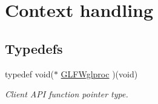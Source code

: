 \hypertarget{group__context}{\section{\-Context handling}
\label{group__context}
}
\subsection*{\-Typedefs}
\begin{DoxyCompactItemize}
\item 
typedef void($\ast$ \hyperlink{group__context_gabf42b10edde1c4fc71e212e576b9f811}{\-G\-L\-F\-Wglproc} )(void)
\begin{DoxyCompactList}\small\item\em \-Client \-A\-P\-I function pointer type. \end{DoxyCompactList}\end{DoxyCompactItemize}
